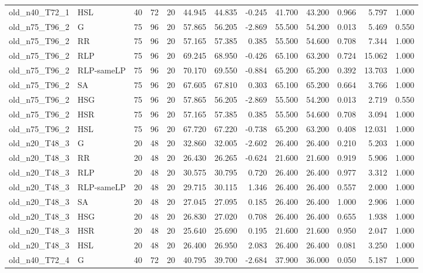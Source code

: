 \begin{table}[htbp]
\begin{tabular}{llrrrrrrrrrrr}
old\_n40\_T72\_1 & HSL & 40 & 72 & 20 & 44.945 & 44.835 & -0.245 & 41.700 & 43.200 & 0.966 & 5.797 & 1.000 \\
old\_n75\_T96\_2 & G & 75 & 96 & 20 & 57.865 & 56.205 & -2.869 & 55.500 & 54.200 & 0.013 & 5.469 & 0.550 \\
old\_n75\_T96\_2 & RR & 75 & 96 & 20 & 57.165 & 57.385 & 0.385 & 55.500 & 54.600 & 0.708 & 7.344 & 1.000 \\
old\_n75\_T96\_2 & RLP & 75 & 96 & 20 & 69.245 & 68.950 & -0.426 & 65.100 & 63.200 & 0.724 & 15.062 & 1.000 \\
old\_n75\_T96\_2 & RLP-sameLP & 75 & 96 & 20 & 70.170 & 69.550 & -0.884 & 65.200 & 65.200 & 0.392 & 13.703 & 1.000 \\
old\_n75\_T96\_2 & SA & 75 & 96 & 20 & 67.605 & 67.810 & 0.303 & 65.100 & 65.200 & 0.664 & 3.766 & 1.000 \\
old\_n75\_T96\_2 & HSG & 75 & 96 & 20 & 57.865 & 56.205 & -2.869 & 55.500 & 54.200 & 0.013 & 2.719 & 0.550 \\
old\_n75\_T96\_2 & HSR & 75 & 96 & 20 & 57.165 & 57.385 & 0.385 & 55.500 & 54.600 & 0.708 & 3.094 & 1.000 \\
old\_n75\_T96\_2 & HSL & 75 & 96 & 20 & 67.720 & 67.220 & -0.738 & 65.200 & 63.200 & 0.408 & 12.031 & 1.000 \\
old\_n20\_T48\_3 & G & 20 & 48 & 20 & 32.860 & 32.005 & -2.602 & 26.400 & 26.400 & 0.210 & 5.203 & 1.000 \\
old\_n20\_T48\_3 & RR & 20 & 48 & 20 & 26.430 & 26.265 & -0.624 & 21.600 & 21.600 & 0.919 & 5.906 & 1.000 \\
old\_n20\_T48\_3 & RLP & 20 & 48 & 20 & 30.575 & 30.795 & 0.720 & 26.400 & 26.400 & 0.977 & 3.312 & 1.000 \\
old\_n20\_T48\_3 & RLP-sameLP & 20 & 48 & 20 & 29.715 & 30.115 & 1.346 & 26.400 & 26.400 & 0.557 & 2.000 & 1.000 \\
old\_n20\_T48\_3 & SA & 20 & 48 & 20 & 27.045 & 27.095 & 0.185 & 26.400 & 26.400 & 1.000 & 2.906 & 1.000 \\
old\_n20\_T48\_3 & HSG & 20 & 48 & 20 & 26.830 & 27.020 & 0.708 & 26.400 & 26.400 & 0.655 & 1.938 & 1.000 \\
old\_n20\_T48\_3 & HSR & 20 & 48 & 20 & 25.640 & 25.690 & 0.195 & 21.600 & 21.600 & 0.950 & 2.047 & 1.000 \\
old\_n20\_T48\_3 & HSL & 20 & 48 & 20 & 26.400 & 26.950 & 2.083 & 26.400 & 26.400 & 0.081 & 3.250 & 1.000 \\
old\_n40\_T72\_4 & G & 40 & 72 & 20 & 40.795 & 39.700 & -2.684 & 37.900 & 36.000 & 0.050 & 5.187 & 1.000 \\

\end{tabular}
\end{table}
